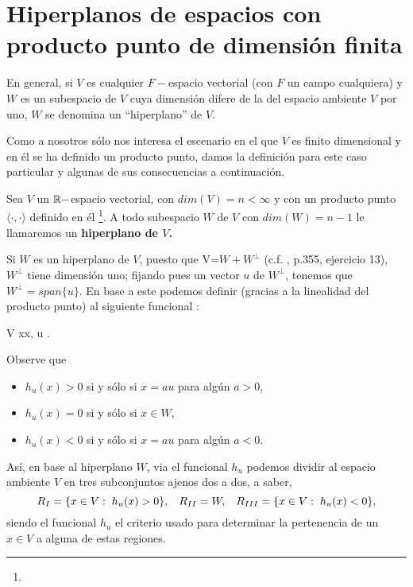 \section{Hiperplanos de espacios con producto punto de dimensión finita}
\label{section: hiperplanos}
En general, si $V$ es cualquier $F-$espacio vectorial (con $F$
un campo cualquiera) y $W$ es un subespacio de $V$
cuya dimensión difere de la del espacio ambiente $V$
por uno, $W$ se denomina un ``hiperplano'' de $V$.

Como a nosotros sólo nos interesa el escenario
en el que $V$ es finito dimensional y 
en él se ha definido un producto punto, damos la
definición para este caso
particular y algunas de sus consecuencias a continuación.

\begin{defi}
Sea $V$ un $\mathbb{R}-$espacio vectorial,
con $dim(V)=n < \infty$ y con un producto punto $\langle \cdot, \cdot \rangle$
definido en él \footnote{}. A todo subespacio
$W$ de $V$ con $dim(W)=n-1$ le llamaremos un
\textbf{hiperplano de $V$.}
\end{defi}



Si $W$ es un hiperplano de $V$, puesto que
V=$W + W^{\perp}$
(c.f. \cite{friedberg}, p.355, ejercicio 13),
$W^{\perp}$ tiene dimensión uno; fijando pues un
vector $u$ de $W^{\perp}$, tenemos que
$W^{\perp}=span\{ u\}$. En base a este 
podemos definir (gracias a la linealidad
del producto punto) al siguiente funcional
:

\begin{center}
{V}
{\IR }
{x}{\langle x, u \rangle.}
\end{center}
Observe que
\begin{itemize}
\item $h_{u}(x)>0$ si y sólo si $x= a u$ para algún $a>0$,
\item $h_{u}(x)=0$ si y sólo si $x \in W$,
\item $h_{u}(x)<0$ si y sólo si $x= a u$ para algún $a<0$.
\end{itemize}
Así, en base al hiperplano $W$, via
el funcional $h_{u}$ podemos dividir
al espacio ambiente $V$ en tres subconjuntos ajenos
dos a dos, a saber, 
\begin{equation}
\label{eq1: 29Nov}
R_{I}= \{ x \in V: \hspace{0.1cm} h_{u}(x)> 0 \},
\hspace{0.3cm}
R_{II}=W, 
\hspace{0.3cm}
R_{III}= \{ x \in V: \hspace{0.1cm} h_{u}(x)<0 \},
\end{equation}
siendo el funcional $h_{u}$ el criterio usado para
determinar la pertenencia de un $x \in V$ a alguna de estas regiones.


